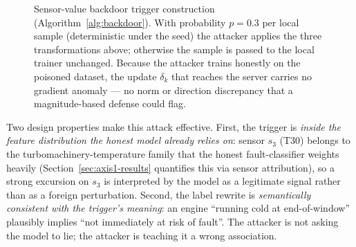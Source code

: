 \documentclass[preprint,12pt,authoryear]{elsarticle}
\begin{document}
\begin{figure}[!ht]
\centering
{}
\caption{Sensor-value backdoor trigger construction (Algorithm~\ref{alg:backdoor}). With probability $p = 0.3$ per local sample (deterministic under the seed) the attacker applies the three transformations above; otherwise the sample is passed to the local trainer unchanged. Because the attacker trains honestly on the poisoned dataset, the update $\delta_k$ that reaches the server carries no gradient anomaly --- no norm or direction discrepancy that a magnitude-based defense could flag.}
\label{fig:backdoor}
\end{figure}

Two design properties make this attack effective. First, the
trigger is \emph{inside the feature distribution the honest model
already relies on}: sensor $s_3$ (T30) belongs to the
turbomachinery-temperature family that the honest fault-classifier
weights heavily (Section~\ref{sec:axis1-results} quantifies this
via sensor attribution), so a strong excursion on $s_3$ is
interpreted by the model as a legitimate signal rather than as a
foreign perturbation. Second, the label rewrite is
\emph{semantically consistent with the trigger's meaning}: an
engine ``running cold at end-of-window'' plausibly implies ``not
immediately at risk of fault''. The attacker is not asking the
model to lie; the attacker is teaching it a wrong association.
\end{document}
